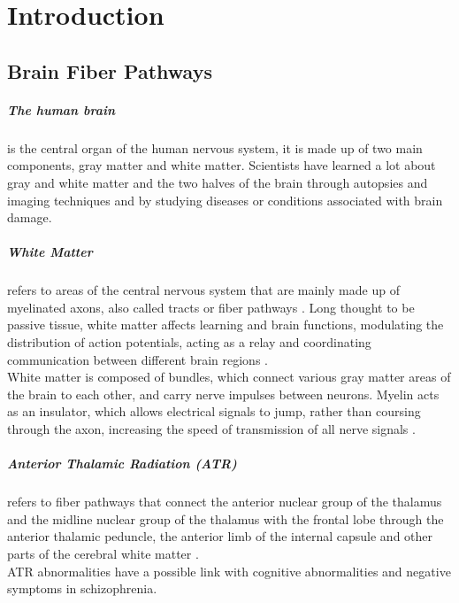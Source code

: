 \documentclass[../structure.tex]{subfiles}
\begin{document}
\chapter{Introduction}
\section{Brain Fiber Pathways}
	\paragraph{The human brain} is the central organ of the human nervous system, it is made up of two main components, gray matter and white matter. Scientists have learned a lot about gray and white matter and the two halves of the brain through autopsies and imaging techniques and by studying diseases or conditions associated with brain damage.
	\paragraph{White Matter}refers to areas of the central nervous system that are mainly made up of myelinated axons, also called tracts or fiber pathways \cite{Blumenfeld2010}. Long thought to be passive tissue, white matter affects learning and brain functions, modulating the distribution of action potentials, acting as a relay and coordinating communication between different brain regions \cite{Fields2008}.
	\\White matter is composed of bundles, which connect various gray matter areas of the brain to each other, and carry nerve impulses between neurons. Myelin acts as an insulator, which allows electrical signals to jump, rather than coursing through the axon, increasing the speed of transmission of all nerve signals \cite{Klein2008}.
 
		\paragraph{Anterior Thalamic Radiation (ATR)}
		refers to fiber pathways that connect the anterior nuclear group of the thalamus and the midline nuclear group of the thalamus with the frontal lobe through the anterior thalamic peduncle, the anterior limb of the internal capsule and other parts of the cerebral white matter \cite{Washington1994}\cite{Grimm2018}.\\
		ATR abnormalities have a possible link with cognitive abnormalities and negative symptoms in schizophrenia\cite{Mamah2010}.
		
\end{document}
